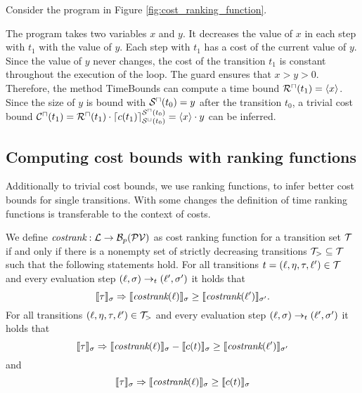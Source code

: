 \begin{example}
  Consider the program in Figure \ref{fig:cost_ranking_function}.
  
  The program takes two variables $x$ and $y$.
  It decreases the value of $x$ in each step with $t_1$ with the value of $y$.
  Each step with $t_1$ has a cost of the current value of $y$.
  Since the value of $y$ never changes, the cost of the transition $t_1$ is constant throughout the execution of the loop.
  The guard ensures that $x > y > 0$.
  Therefore, the method TimeBounds can compute a time bound ${\mathcal{R}^\sqcap}(t_1) = \langle x\rangle$.
  Since the size of $y$ is bound with ${\mathcal{S}^\sqcap}(t_0) = y$ after the transition $t_0$, a trivial cost bound ${\mathcal{C}^\sqcap}(t_1) = {\mathcal{R}^\sqcap}(t_1) \cdot \lceil c(t_1) \rceil^{{\mathcal{S}^\sqcap}(t_0)}_{{\mathcal{S}^\sqcup}(t_0)} = \langle x\rangle \cdot y$ can be inferred.
\end{example}

\subsection{Computing cost bounds with ranking functions}

Additionally to trivial cost bounds, we use ranking functions, to infer better cost bounds for single transitions.
With some changes the definition of time ranking functions is transferable to the context of costs.

\begin{definition} 
  We define $\emph{costrank}: \mathcal{L} \rightarrow \mathcal{B}_p(\mathcal{PV})$ as cost ranking function for a transition set $\mathcal{T}$ if and only if there is a nonempty set of strictly decreasing transitions $\mathcal{T}_{>} \subseteq \mathcal{T}$ such that the following statements hold.
  For all transitions $t = (\ell, \eta, \tau, \ell') \in \mathcal{T}$ and every evaluation step $(\ell, \sigma) \rightarrow_t (\ell', \sigma')$ it holds that
  \[ \llbracket \tau \rrbracket_{\sigma} \Rightarrow \llbracket \emph{costrank}(\ell) \rrbracket_{\sigma} \geq \llbracket \emph{costrank}(\ell') \rrbracket_{\sigma'}. \]
  For all transitions $(\ell, \eta, \tau, \ell') \in \mathcal{T}_{>}$ and every evaluation step $(\ell, \sigma) \rightarrow_t (\ell', \sigma')$ it holds that        
  \[ \llbracket \tau \rrbracket_{\sigma} \Rightarrow \llbracket \emph{costrank}(\ell) \rrbracket_{\sigma} - \llbracket c(t) \rrbracket_{\sigma} \geq \llbracket \emph{costrank}(\ell') \rrbracket_{\sigma'} \]
  and
  \[ \llbracket \tau \rrbracket_{\sigma} \Rightarrow \llbracket \emph{costrank}(\ell) \rrbracket_{\sigma} \geq \llbracket c(t) \rrbracket_{\sigma} \]
\end{definition}

